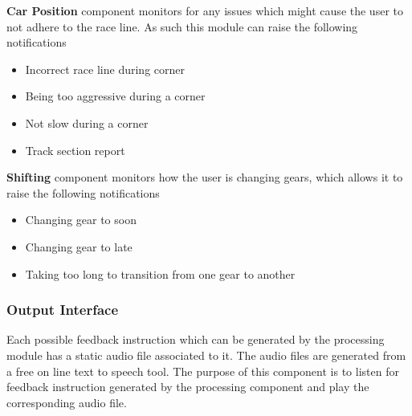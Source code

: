 \textbf{Car Position} component monitors for any issues which might cause the user to not adhere to the race line. As such this module can raise the following notifications 
\begin{itemize}
	\item Incorrect race line during corner
	\item Being too aggressive during a corner
	\item Not slow during a corner
	\item Track section report
\end{itemize}

\textbf{Shifting} component monitors how the user is changing gears, which allows it to raise the following notifications
\begin{itemize}
	\item Changing gear to soon
	\item Changing gear to late
	\item Taking too long to transition from one gear to another
\end{itemize}

\subsubsection{Output Interface}
Each possible feedback instruction which can be generated by the processing module has a static audio file associated to it. The audio files are generated from a free on line text to speech tool. The purpose of this component is to listen for feedback instruction generated by the processing component and play the corresponding audio file.